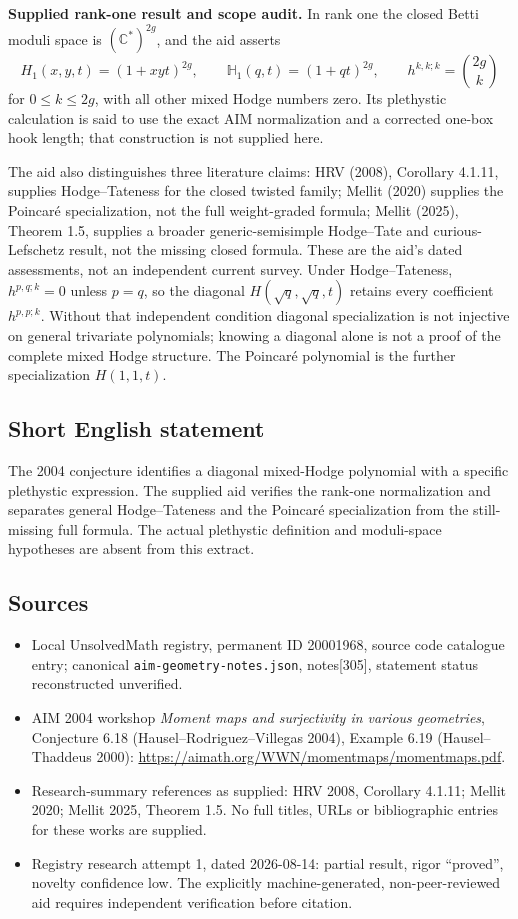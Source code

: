 \documentclass[11pt]{article}
\newcommand{\C}{\mathbb{C}}
\begin{document}
\textbf{Supplied rank-one result and scope audit.} In rank one the closed Betti moduli space is $(\C^*)^{2g}$, and the aid asserts
\[
 H_1(x,y,t)=(1+xyt)^{2g},\qquad
 \mathbb H_1(q,t)=(1+qt)^{2g},\qquad
 h^{k,k;k}=\binom{2g}{k}
\]
for $0\le k\le2g$, with all other mixed Hodge numbers zero. Its plethystic calculation is said to use the exact AIM normalization and a corrected one-box hook length; that construction is not supplied here.

The aid also distinguishes three literature claims: HRV (2008), Corollary 4.1.11, supplies Hodge--Tateness for the closed twisted family; Mellit (2020) supplies the Poincar\'e specialization, not the full weight-graded formula; Mellit (2025), Theorem 1.5, supplies a broader generic-semisimple Hodge--Tate and curious-Lefschetz result, not the missing closed formula. These are the aid's dated assessments, not an independent current survey. Under Hodge--Tateness, $h^{p,q;k}=0$ unless $p=q$, so the diagonal $H(\sqrt q,\sqrt q,t)$ retains every coefficient $h^{p,p;k}$. Without that independent condition diagonal specialization is not injective on general trivariate polynomials; knowing a diagonal alone is not a proof of the complete mixed Hodge structure. The Poincar\'e polynomial is the further specialization $H(1,1,t)$.
\subsection{Short English statement}
The 2004 conjecture identifies a diagonal mixed-Hodge polynomial with a specific plethystic expression. The supplied aid verifies the rank-one normalization and separates general Hodge--Tateness and the Poincar\'e specialization from the still-missing full formula. The actual plethystic definition and moduli-space hypotheses are absent from this extract.
\subsection{Sources}
\begin{itemize}
\item Local UnsolvedMath registry, permanent ID 20001968, source code catalogue entry; canonical \texttt{aim-geometry-notes.json}, notes[305], statement status reconstructed unverified.
\item AIM 2004 workshop \emph{Moment maps and surjectivity in various geometries}, Conjecture 6.18 (Hausel--Rodriguez--Villegas 2004), Example 6.19 (Hausel--Thaddeus 2000): \url{https://aimath.org/WWN/momentmaps/momentmaps.pdf}.
\item Research-summary references as supplied: HRV 2008, Corollary 4.1.11; Mellit 2020; Mellit 2025, Theorem 1.5. No full titles, URLs or bibliographic entries for these works are supplied.
\item Registry research attempt 1, dated 2026-08-14: partial result, rigor ``proved'', novelty confidence low. The explicitly machine-generated, non-peer-reviewed aid requires independent verification before citation.
\end{itemize}
\end{document}
